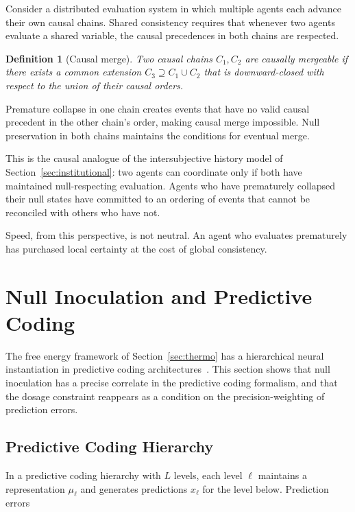 \documentclass[11pt]{article}
\newtheorem{definition}{Definition}
\theoremstyle{remark}
\begin{document}
Consider a distributed evaluation system in which multiple agents each advance their own causal chains. Shared consistency requires that whenever two agents evaluate a shared variable, the causal precedences in both chains are respected.

\begin{definition}[Causal merge]
Two causal chains $C_1, C_2$ are \emph{causally mergeable} if there exists a common extension $C_3 \supseteq C_1 \cup C_2$ that is downward-closed with respect to the union of their causal orders.
\end{definition}

Premature collapse in one chain creates events that have no valid causal precedent in the other chain's order, making causal merge impossible. Null preservation in both chains maintains the conditions for eventual merge.

This is the causal analogue of the intersubjective history model of Section~\ref{sec:institutional}: two agents can coordinate only if both have maintained null-respecting evaluation. Agents who have prematurely collapsed their null states have committed to an ordering of events that cannot be reconciled with others who have not.

Speed, from this perspective, is not neutral. An agent who evaluates prematurely has purchased local certainty at the cost of global consistency.

\section{Null Inoculation and Predictive Coding}
\label{sec:predictive_coding}

The free energy framework of Section~\ref{sec:thermo} has a hierarchical neural instantiation in predictive coding architectures~\cite{friston}. This section shows that null inoculation has a precise correlate in the predictive coding formalism, and that the dosage constraint reappears as a condition on the precision-weighting of prediction errors.

\subsection{Predictive Coding Hierarchy}

In a predictive coding hierarchy with $L$ levels, each level $\ell$ maintains a representation $\mu_\ell$ and generates predictions $\hat{x}_\ell$ for the level below. Prediction errors
\end{document}
